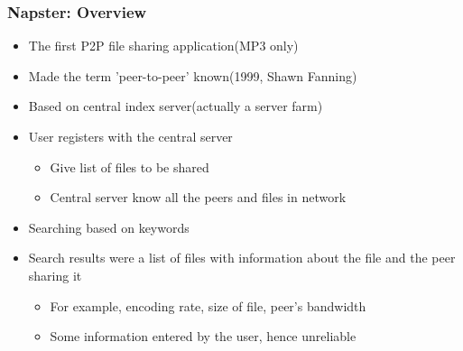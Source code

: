 \begin{frame}
    \frametitle{Napster: Overview}
    \begin{itemize}
        \item The first P2P file sharing application(MP3 only)
        \item Made the term 'peer-to-peer' known(1999, Shawn Fanning)
        \item Based on central index server(actually a server farm)
        \item User registers with the central server
        \begin{itemize}
            \item Give list of files to be shared
            \item Central server know all the peers and files in network
        \end{itemize}
        \item Searching based on keywords
        \item Search results were a list of files with information about the file and the peer sharing it
        \begin{itemize}
            \item For example, encoding rate, size of file, peer's bandwidth
            \item Some information entered by the user, hence unreliable
        \end{itemize}
    \end{itemize}
\end{frame}

